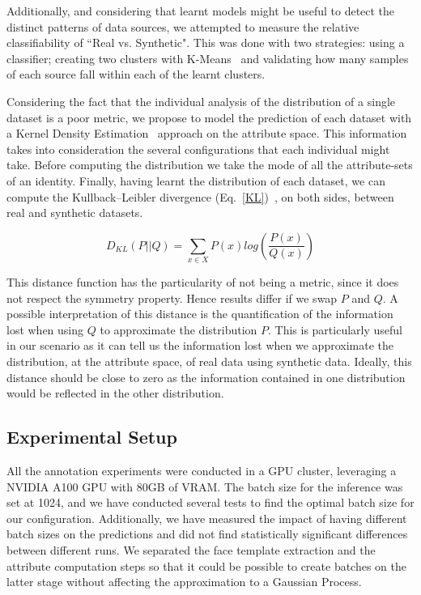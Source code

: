 \documentclass[a4paper, 10pt, conference]{ieeeconf}      %
\begin{document}
Additionally, and considering that learnt models might be useful to detect the distinct patterns of data sources, we attempted to measure the relative classifiability of ``Real vs. Synthetic". This was done with two strategies: using a classifier; creating two clusters with K-Means~\cite{macqueen1967some} and validating how many samples of each source fall within each of the learnt clusters.



Considering the fact that the individual analysis of the distribution of a single dataset is a poor metric, we propose to model the prediction of each dataset with a Kernel Density Estimation~\cite{davis2011remarks, parzen1962estimation} approach on the attribute space. This information takes into consideration the several configurations that each individual might take. Before computing the distribution we take the mode of all the attribute-sets of an identity. Finally, having learnt the distribution of each dataset, we can compute the Kullback–Leibler divergence (Eq.~\ref{KL})~\cite{kullback1951information}, on both sides, between real and synthetic datasets. 

\begin{equation}
    D_{KL}(P||Q) = \sum_{x\in X} P(x) log(\frac{P(x)}{Q(x)})
    \label{KL}
\end{equation}

This distance function has the particularity of not being a metric, since it does not respect the symmetry property. Hence results differ if we swap $P$ and $Q$. A possible interpretation of this distance is the quantification of the information lost when using $Q$ to approximate the distribution $P$. This is particularly useful in our scenario as it can tell us the information lost when we approximate the distribution, at the attribute space, of real data using synthetic data. Ideally, this distance should be close to zero as the information contained in one distribution would be reflected in the other distribution. 


 
\subsection{Experimental Setup}

All the annotation experiments were conducted in a GPU cluster, leveraging a NVIDIA A100 GPU with 80GB of VRAM. The batch size for the inference was set at 1024, and we have conducted several tests to find the optimal batch size for our configuration. Additionally, we have measured the impact of having different batch sizes on the predictions and did not find statistically significant differences between different runs. We separated the face template extraction and the attribute computation steps so that it could be possible to create batches on the latter stage without affecting the approximation to a Gaussian Process. 
\end{document}
